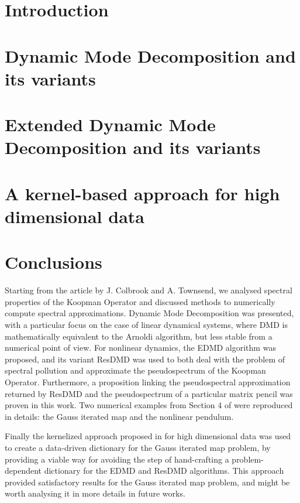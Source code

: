 \documentclass[10pt, a4paper]{report}
\begin{document}
\clearpage
\thispagestyle{empty}
\tableofcontents

\setcounter{page}{1}

\chapter{Introduction}


\chapter{Dynamic Mode Decomposition and its variants}


\chapter{Extended Dynamic Mode Decomposition and its variants}


\chapter{A kernel-based approach for high dimensional data}


\chapter{Conclusions}
Starting from the article \cite{colbrook_rigorous_2021} by J. Colbrook and A. Townsend, we analysed spectral properties of the Koopman Operator and discussed methods to numerically compute spectral approximations. Dynamic Mode Decomposition was presented, with a particular focus on the case of linear dynamical systems, where DMD is mathematically equivalent to the Arnoldi algorithm, but less stable from a numerical point of view. For nonlinear dynamics, the EDMD algorithm was proposed, and its variant ResDMD was used to both deal with the problem of spectral pollution and approximate the pseudospectrum of the Koopman Operator. Furthermore, a proposition linking the pseudospectral approximation returned by ResDMD and the pseudospectrum of a particular matrix pencil was proven in this work. Two numerical examples from Section 4 of \cite{colbrook_rigorous_2021} were reproduced in details: the Gauss iterated map and the nonlinear pendulum. 

Finally the kernelized approach proposed in \cite{colbrook_rigorous_2021} for high dimensional data was used to create a data-driven dictionary for the Gauss iterated map problem, by providing a viable way for avoiding the step of hand-crafting a problem-dependent dictionary for the EDMD and ResDMD algorithms. This approach provided satisfactory results for the Gauss iterated map problem, and might be worth analysing it in more details in future works.

\nocite{*}
\printbibliography
\end{document}
